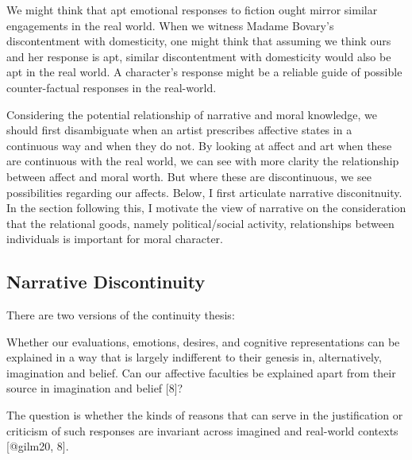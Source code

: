 \documentclass[
  12pt,
]{book}
\newenvironment{Shaded}{\begin{snugshade}}{\end{snugshade}}
\newcommand{\NormalTok}[1]{#1}
\theoremstyle{definition}
\theoremstyle{definition}
\theoremstyle{definition}
\theoremstyle{definition}
\theoremstyle{remark}
\begin{document}
We might think that apt emotional responses to fiction ought mirror similar engagements in the real world. When we witness Madame Bovary's discontentment with domesticity, one might think that assuming we think ours and her response is apt, similar discontentment with domesticity would also be apt in the real world. A character's response might be a reliable guide of possible counter-factual responses in the real-world.

Considering the potential relationship of narrative and moral knowledge, we should first disambiguate when an artist prescribes affective states in a continuous way and when they do not. By looking at affect and art when these are continuous with the real world, we can see with more clarity the relationship between affect and moral worth. But where these are discontinuous, we see possibilities regarding our affects. Below, I first articulate narrative disconitnuity. In the section following this, I motivate the view of narrative on the consideration that the relational goods, namely political/social activity, relationships between individuals is important for moral character.

\subsection*{Narrative Discontinuity}\label{narrative-discontinuity}

There are two versions of the continuity thesis:

\begin{Shaded}
\begin{Highlighting}[]

\NormalTok{Whether our evaluations, emotions, desires, and cognitive representations can be explained in a way that is largely indifferent to their genesis in, alternatively, imagination and belief. Can our affective faculties be explained apart from their source in imagination and belief [8]?}
\end{Highlighting}
\end{Shaded}

\begin{Shaded}
\begin{Highlighting}[]

\NormalTok{The question is whether the kinds of reasons that can serve in the justification or criticism of such responses are invariant across imagined and real{-}world contexts [@gilm20, 8].}
\end{Highlighting}
\end{Shaded}
\end{document}
